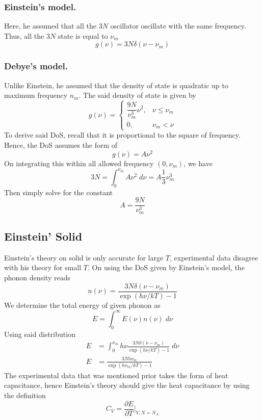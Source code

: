 \documentclass[../../../Main.tex]{subfiles}
\begin{document}
\subsubsection*{Einstein's model.} Here, he assumed that all the $3N$ oscillator oscillate with the same frequency. Thus, all the $3N$ state is equal to $\nu_m$
\begin{equation*}
    g(\nu)=3N\delta(\nu-\nu_m)
\end{equation*}

\subsubsection*{Debye's model.} Unlike Einstein, he assumed that the density of state is quadratic up to maximum frequency $n_m$. The said density of state is given by 
\begin{equation*}
    g(\nu)=\begin{cases}
        \dfrac{9N}{\nu_m^3}\nu^2,&\nu\leq\nu_m\\
        0,&\nu_m<\nu
    \end{cases}
\end{equation*}
To derive said DoS, recall that it is proportional to the square of frequency. Hence, the DoS assumes the form of 
\begin{equation*}
    g(\nu)=A\nu^2
\end{equation*}
On integrating this within all allowed frequency $(0,\nu_m)$, we have 
\begin{equation*}
    3N=\int_{0}^{\nu_m}A\nu^2\;d\nu=A\frac{1}{3}\nu_m^3
\end{equation*}
Then simply solve for the constant 
\begin{equation*}
    A=\frac{9N}{\nu_m^3}
\end{equation*}

\subsection*{Einstein' Solid}
Einstein's theory on solid is only accurate for large $T$, experimental data disagree with his theory for small $T$. On using the DoS given by Einstein's model, the phonon density reads 
\begin{equation*}
    n(\nu)=\frac{3N\delta(\nu-\nu_m)}{\exp(h\nu/kT)-1}
\end{equation*}
We determine the total energy of given phonon as 
\begin{equation*}
    E=\int_{0}^{\infty}E(\nu)n(\nu)\;d\nu
\end{equation*}
Using said distribution
\begin{align*}
    E&=\int_{0}^{\nu_m}h\nu \frac{3N\delta(\nu-\nu_m)}{\exp(h\nu/kT)-1}\;d\nu\\
    E&=\frac{3Nh\nu_m}{\exp(h\nu_m/kT)-1}
\end{align*}
The experimental data that was mentioned prior takes the form of heat capacitance, hence Einstein's theory should give the heat capacitance by using the definition 
\begin{equation*}
    C_V=\frac{\partial E}{\partial T}\bigg|_{V,N=N_A}
\end{equation*}
\end{document}
